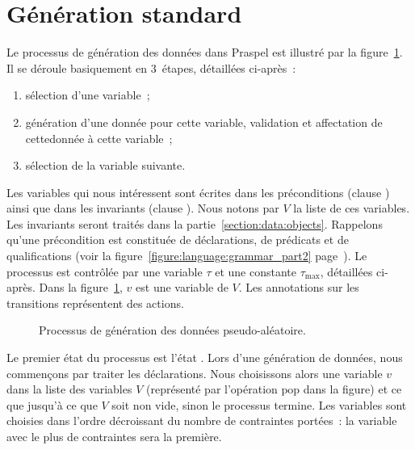 \section{Génération standard}
\label{section:data:random}

Le processus de génération des données dans Praspel est illustré par la
figure~\ref{figure:data:process}. Il se déroule basiquement en 3~étapes,
détaillées ci-après~:
%
\begin{enumerate}

\item sélection d'une variable~;

\item génération d'une donnée pour cette variable, validation et affectation de
cettedonnée à cette variable~;

\item sélection de la variable suivante.

\end{enumerate}

Les variables qui nous intéressent sont écrites dans les préconditions (clause
\arequires) ainsi que dans les invariants (clause \ainvariant). Nous notons par
$V$ la liste de ces variables. Les invariants seront traités dans la
partie~\ref{section:data:objects}. Rappelons qu'une précondition est constituée
de déclarations, de prédicats et de qualifications (voir la
figure~\ref{figure:language:grammar_part2}
page~\pageref{figure:language:grammar_part2}). Le processus est contrôlée par
une variable $\tau$ et une constante $\tau_\mathrm{max}$, détaillées ci-après.
Dans la figure~\ref{figure:data:process}, $v$ est une variable de $V$. Les
annotations sur les transitions représentent des actions.
%
\begin{figure}


\caption{\label{figure:data:process} Processus de génération des données
pseudo-aléatoire.}

\end{figure}

Le premier état du processus est l'état . Lors d'une génération de
données, nous commençons par traiter les déclarations. Nous choisissons alors
une variable $v$ dans la liste des variables $V$ (représenté par l'opération
$\mathrm{pop}$ dans la figure) et ce que jusqu'à ce que $V$ soit non vide, sinon
le processus termine. Les variables sont choisies dans l'ordre décroissant du
nombre de contraintes portées~: la variable avec le plus de contraintes sera la
première.

